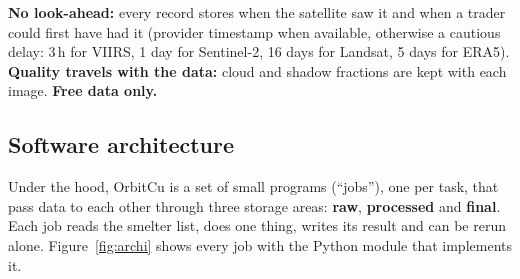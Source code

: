 \documentclass[10pt,a4paper]{article}
\begin{document}
\begin{notebox}
\textbf{No look-ahead:} every record stores when the satellite saw it and when a trader could first have had it (provider timestamp when available, otherwise a cautious delay: 3\,h for VIIRS, 1 day for Sentinel-2, 16 days for Landsat, 5 days for ERA5). \textbf{Quality travels with the data:} cloud and shadow fractions are kept with each image. \textbf{Free data only.}
\end{notebox}

\subsection{Software architecture}
Under the hood, OrbitCu is a set of small programs (``jobs''), one per task, that pass data to each other through three storage areas: \textbf{raw}, \textbf{processed} and \textbf{final}. Each job reads the smelter list, does one thing, writes its result and can be rerun alone. Figure~\ref{fig:archi} shows every job with the Python module that implements it.
\end{document}
